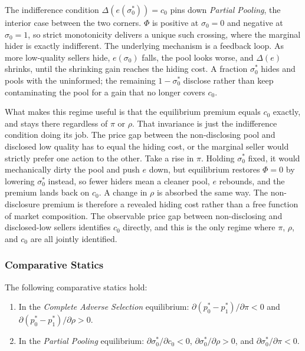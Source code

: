 The indifference condition $\Delta(e(\sigma_0^*))=c_0$ pins down \emph{Partial Pooling}, the interior case between the two corners. $\Phi$ is positive at $\sigma_0=0$ and negative at $\sigma_0=1$, so strict monotonicity delivers a unique such crossing, where the marginal hider is exactly indifferent. The underlying mechanism is a feedback loop. As more low-quality sellers hide, $e(\sigma_0)$ falls, the pool looks worse, and $\Delta(e)$ shrinks, until the shrinking gain reaches the hiding cost. A fraction $\sigma_0^*$ hides and pools with the uninformed; the remaining $1-\sigma_0^*$ disclose rather than keep contaminating the pool for a gain that no longer covers $c_0$.

What makes this regime useful is that the equilibrium premium equals $c_0$ exactly, and stays there regardless of $\pi$ or $\rho$. That invariance is just the indifference condition doing its job. The price gap between the non-disclosing pool and disclosed low quality has to equal the hiding cost, or the marginal seller would strictly prefer one action to the other. Take a rise in $\pi$. Holding $\sigma_0^*$ fixed, it would mechanically dirty the pool and push $e$ down, but equilibrium restores $\Phi=0$ by lowering $\sigma_0^*$ instead, so fewer hiders mean a cleaner pool, $e$ rebounds, and the premium lands back on $c_0$. A change in $\rho$ is absorbed the same way. The non-disclosure premium is therefore a revealed hiding cost rather than a free function of market composition. The observable price gap between non-disclosing and disclosed-low sellers identifies $c_0$ directly, and this is the only regime where $\pi$, $\rho$, and $c_0$ are all jointly identified.

\subsubsection{Comparative Statics}

\begin{proposition}
\label{prop:comparative_statics}
The following comparative statics hold:
\begin{enumerate}[label=(\roman*)]
    \item In the \emph{Complete Adverse Selection} equilibrium: $\partial(p_0^*-p_1^*)/\partial\pi < 0$ and $\partial(p_0^*-p_1^*)/\partial\rho > 0$.
    \item In the \emph{Partial Pooling} equilibrium: $\partial\sigma_0^*/\partial c_0 < 0$, $\partial\sigma_0^*/\partial\rho > 0$, and $\partial\sigma_0^*/\partial\pi < 0$.
\end{enumerate}
\end{proposition}

